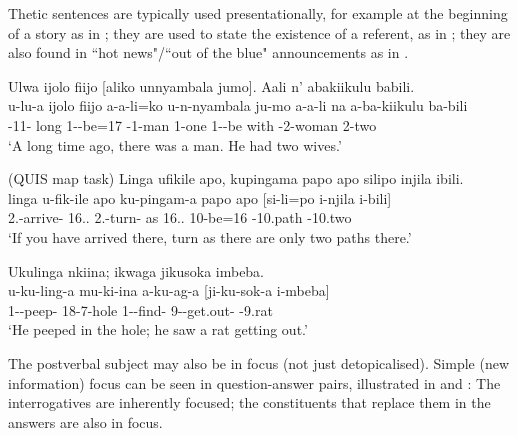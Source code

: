 \documentclass[output=paper]{langscibook}
\begin{document}
Thetic sentences are typically used presentationally, for example at the beginning of a story as in ; they are used to state the existence of a referent, as in ; they are also found in ``hot news"/``out of the blue" announcements as in .

\ea
\label{bkm:Ref136349676}
Ulwa ijolo fiijo [aliko unnyambala jumo]. Aali n’ abakiikulu babili.\\
\gll
u-lu-a  ijolo  fiijo  a-a-li=ko  u-n-nyambala  ju-mo  a-a-li  na   a-ba-kiikulu  ba-bili \\
\AUG{}-11-\CONN{}  long  \INT{}  1\SM-\PST{}-be=17  \AUG{}-1-man  1-one  1\SM{}-\PST{}-be  with \AUG{}-2-woman  2-two \\
\glt
‘A long time ago, there was a man. He had two wives.’ \citep[170]{MsovelaEtAl2023}\\

\z

\ea
\label{bkm:Ref136349684}
(QUIS map task)
Linga ufikile apo, kupingama papo apo silipo injila ibili.\\
\gll
linga  u-fik-ile  apo  ku-pingam-a  papo  apo [si-li=po  i-njila  i-bili]\\
\COND{}  2\SG.\SM{}-arrive-\PFV{}  16.\DEM.\MED{}  2\SG.\SM{}-turn-\FV{}  as  16.\DEM.\MED{} {\db}10\SM-be=16  \AUG{}-10.path  \AUG{}-10.two\\
\glt
‘If you have arrived there, turn as there are only two paths there.’ \citep[170]{MsovelaEtAl2023}\\

\z

\ea
\label{bkm:Ref136349695}
Ukulinga nkiina; ikwaga jikusoka imbeba.\\
\gll
u-ku-ling-a  mu-ki-ina  a-ku-ag-a  [ji-ku-sok-a  i-mbeba]\\
1\SM{}-\PRS{}-peep-\FV{}  18-7-hole  1\SM-\PRS{}-find-\FV{}  {\db}9\SM-\PRS{}-get.out-\FV{}  \AUG{}-9.rat\\
\glt
‘He peeped in the hole; he saw a rat getting out.’ \citep[170]{MsovelaEtAl2023}\\

\z


The postverbal subject may also be in focus (not just detopicalised). Simple (new information) focus can be seen in question-answer pairs, illustrated in  and : The interrogatives are inherently focused; the constituents that replace them in the answers are also in focus.
\end{document}
